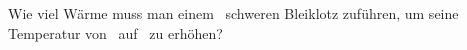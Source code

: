 Wie viel Wärme muss man einem \mPbO\ schweren Bleiklotz zuführen, um seine Temperatur von \TaO\ auf \TbO\ zu erhöhen?
